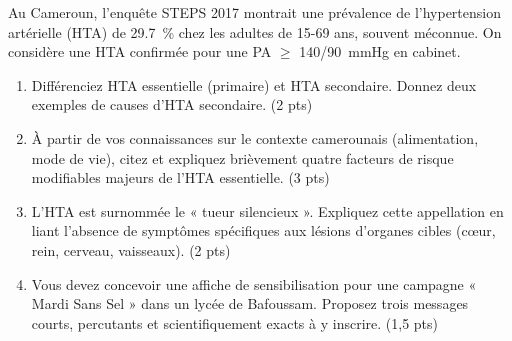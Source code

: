 \documentclass[11pt]{article}
\begin{document}
\begin{exercice}
Au Cameroun, l'enquête STEPS 2017 montrait une prévalence de l'hypertension artérielle (HTA) de \SI{29,7}{\%} chez les adultes de 15-69 ans, souvent méconnue. On considère une HTA confirmée pour une PA $\ge$ \SI{140/90}{mmHg} en cabinet.

\begin{enumerate}
    \item Différenciez HTA essentielle (primaire) et HTA secondaire. Donnez deux exemples de causes d'HTA secondaire. \hfill (2 pts)
    \item À partir de vos connaissances sur le contexte camerounais (alimentation, mode de vie), citez et expliquez brièvement quatre facteurs de risque modifiables majeurs de l'HTA essentielle. \hfill (3 pts)
    \item L'HTA est surnommée le « tueur silencieux ». Expliquez cette appellation en liant l'absence de symptômes spécifiques aux lésions d'organes cibles (cœur, rein, cerveau, vaisseaux). \hfill (2 pts)
    \item Vous devez concevoir une affiche de sensibilisation pour une campagne « Mardi Sans Sel » dans un lycée de Bafoussam. Proposez trois messages courts, percutants et scientifiquement exacts à y inscrire. \hfill (1,5 pts)
\end{enumerate}
\end{exercice}
\end{document}
